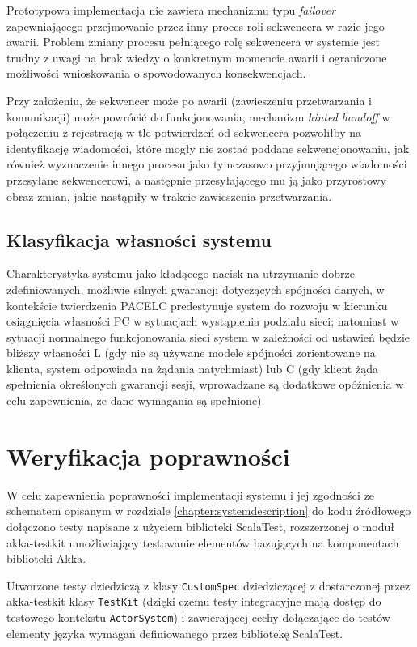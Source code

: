 Prototypowa implementacja nie zawiera mechanizmu typu \textit{failover} zapewniającego przejmowanie przez inny proces roli sekwencera w razie jego awarii. Problem zmiany procesu pełniącego rolę sekwencera w systemie jest trudny z uwagi na brak wiedzy o konkretnym momencie awarii i ograniczone możliwości wnioskowania o spowodowanych konsekwencjach.

Przy założeniu, że sekwencer może po awarii (zawieszeniu przetwarzania i komunikacji) może powrócić do funkcjonowania, mechanizm \textit{hinted handoff} w połączeniu z rejestracją w tle potwierdzeń od sekwencera pozwoliłby na identyfikację wiadomości, które mogły nie zostać poddane sekwencjonowaniu, jak również wyznaczenie innego procesu jako tymczasowo przyjmującego wiadomości przesyłane sekwencerowi, a następnie przesyłającego mu ją jako przyrostowy obraz zmian, jakie nastąpiły w trakcie zawieszenia przetwarzania.

\subsection{Klasyfikacja własności systemu}

Charakterystyka systemu jako kładącego nacisk na utrzymanie dobrze zdefiniowanych, możliwie silnych gwarancji dotyczących spójności danych, w kontekście twierdzenia PACELC predestynuje system do rozwoju w kierunku osiągnięcia własności PC w sytuacjach wystąpienia podziału sieci; natomiast w sytuacji normalnego funkcjonowania sieci system w zależności od ustawień będzie bliższy własności L (gdy nie są używane modele spójności zorientowane na klienta, system odpowiada na żądania natychmiast) lub C (gdy klient żąda spełnienia określonych gwarancji sesji, wprowadzane są dodatkowe opóźnienia w celu zapewnienia, że dane wymagania są spełnione).

\section{Weryfikacja poprawności} \label{section:correctnesstests}

W celu zapewnienia poprawności implementacji systemu i jej zgodności ze schematem opisanym w rozdziale \ref{chapter:systemdescription} do kodu źródłowego dołączono testy napisane z użyciem biblioteki ScalaTest, rozszerzonej o moduł akka-testkit umożliwiający testowanie elementów bazujących na komponentach biblioteki Akka.

Utworzone testy dziedziczą z klasy \texttt{CustomSpec} dziedziczącej z dostarczonej przez akka-testkit klasy \texttt{TestKit} (dzięki czemu testy integracyjne mają dostęp do testowego kontekstu \texttt{ActorSystem}) i zawierającej cechy dołączające do testów elementy języka wymagań definiowanego przez bibliotekę ScalaTest.

